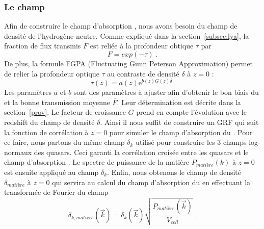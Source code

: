 \documentclass[11pt, twoside, a4paper, openright]{report}
\begin{document}
\subsubsection{Le champ \lya{}}
Afin de construire le champ d'absorption \lya{}, nous avons besoin du champ de densité de l'hydrogène neutre. Comme expliqué dans la section~\ref{subsec:lya}, la fraction de flux transmis $F$ est reliée à la profondeur obtique $\tau$ par
\begin{equation}
  F = exp(- \tau) \; .
\end{equation}
De plus, la formule FGPA (Fluctuating Gunn Peterson Approximation) permet de relier la profondeur optique $\tau$ au contraste de densité $\delta$ à $z = 0$ :
\begin{equation}
  \label{eq:fgpa1}
  \tau(z) = a(z) \mathrm{e}^{b(z) G(z) \delta} \;
\end{equation}
Les paramètres $a$ et $b$ sont des paramètres à ajuster afin d'obtenir le bon biais du \lya{} et la bonne transmission moyenne $\overline F$. Leur détermination est décrite dans la section~\ref{prov}. Le facteur de croissance $G$ prend en compte l'évolution avec le redshift du champ de densité $\delta$. Ainsi il nous suffit de construire un GRF qui suit la fonction de corrélation à $z=0$ pour simuler le champ d'absorption du \lya{}. Pour ce faire, nous partons du même champ $\delta_k$ utilisé pour construire les 3 champs log-normaux des quasars. Ceci garanti la corrélation croisée entre les quasars et le champ d'absorption \lya{}. Le spectre de puissance de la matière $P_{matière}(k)$ à $z=0$ est ensuite appliqué au champ $\delta_k$. Enfin, nous obtenons le champ de densité $\delta_{matière}$ à $z = 0$ qui servira au calcul du champ d'absorption du \lya{} en effectuant la transformée de Fourier du champ
\begin{equation}
  \delta_{k, matière}(\vec k)  = \delta_k(\vec k) \sqrt{\frac{P_{matière}(\vec k)}{V_{cell}}} \; .
\end{equation}
\end{document}
